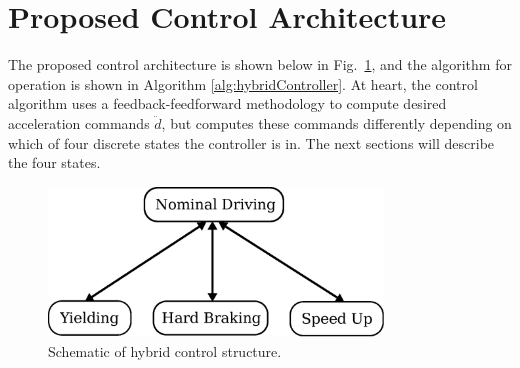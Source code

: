\documentclass[letterpaper, 10 pt, conference]{ieeeconf}  %
\begin{document}
\section{Proposed Control Architecture}

The proposed control architecture is shown below in Fig.~\ref{fig:hybridController}, and the algorithm for operation is shown in Algorithm \ref{alg:hybridController}. At heart, the control algorithm uses a feedback-feedforward methodology to compute desired acceleration commands $\ddot{d}$, but computes these commands differently depending on which of four discrete states the controller is in. The next sections will describe the four states. 

\begin{figure}
\centering
\includegraphics[width=3.5in]{figures/stateDiagram.eps}
\caption{Schematic of hybrid control structure.}
\label{fig:hybridController}
\end{figure}
\end{document}
